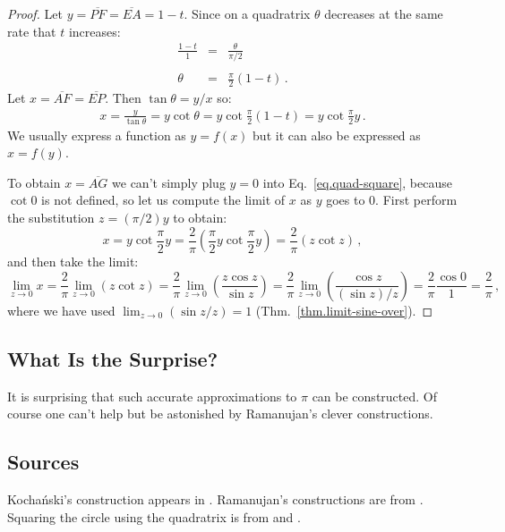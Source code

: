 \begin{proof}
Let $y=\overline{PF}=\overline{EA}=1-t$. Since on a quadratrix $\theta$ decreases at the same rate that $t$ increases:
\begin{eqnarray*}
\frac{1-t}{1} &=& \frac{\theta}{\pi/2}\\
&&\\
\theta &=&\frac{\pi}{2}(1-t)\,.
\end{eqnarray*}
Let $x=\overline{AF}=\overline{EP}$. Then $\tan \theta = y/x$ so:
\begin{align}\label{eq.quad-square}
x = \frac{y}{\tan\theta}=y\cot\theta=y\cot \frac{\pi}{2}(1-t)=y\cot \frac{\pi}{2}y\,.
\end{align}
We usually express a function as $y=f(x)$ but it can also be expressed as $x=f(y)$. 

To obtain $x=\overline{AG}$ we can't simply plug $y=0$ into Eq.~\ref{eq.quad-square}, because $\cot 0$ is not defined, so let us compute the limit of $x$ as $y$ goes to $0$. 
First perform the substitution $z=(\pi/2)y$ to obtain:
\[
x = y\cot \frac{\pi}{2}y = \frac{2}{\pi} \left(\frac{\pi}{2}y\cot \frac{\pi}{2}y\right)=\frac{2}{\pi}(z\cot z)\,,
\]
and then take the limit:
\[
\lim_{z\rightarrow 0} x=\frac{2}{\pi}\lim_{z\rightarrow 0} (z\cot z) = \frac{2}{\pi}\lim_{z\rightarrow 0} \left(\frac{z\cos z}{\sin z}\right) = \frac{2}{\pi}\lim_{z\rightarrow 0} \left(\frac{\cos z}{(\sin z)/z}\right) = \frac{2}{\pi}\frac{\cos 0}{1} = \frac{2}{\pi}\,,
\]
where we have used $\lim_{z\rightarrow 0} (\sin z/z)=1$ (Thm.~\ref{thm.limit-sine-over}).
\end{proof}

\subsection*{What Is the Surprise?}

It is surprising that such accurate approximations to $\pi$ can be constructed. Of course one can't help but be astonished by Ramanujan's clever constructions.

\subsection*{Sources}
Kocha\'{n}ski's construction appears in \cite{bold}. Ramanujan's constructions are from \cite{ramanujan1,ramanujan2}. Squaring the circle using the quadratrix is from \cite[pp.~48--49]{martin} and \cite{wiki:quad}.
